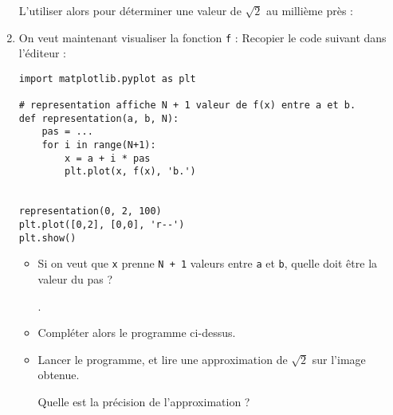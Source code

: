 \documentclass[
	classe=$1^{ere} STI2D$,
]
{informatique}
\begin{document}
\begin{enumerate}
	      L'utiliser alors pour déterminer une valeur de $\sqrt{2}$ au millième près : 
	\item On veut maintenant visualiser la fonction \texttt{f} : Recopier le code suivant dans l'éditeur :
	      \begin{lstlisting}
import matplotlib.pyplot as plt

# representation affiche N + 1 valeur de f(x) entre a et b. 
def representation(a, b, N):
    pas = ...
    for i in range(N+1):
        x = a + i * pas
        plt.plot(x, f(x), 'b.')


representation(0, 2, 100)   
plt.plot([0,2], [0,0], 'r--')
plt.show()
          \end{lstlisting}
	      \begin{itemize}
		      \item Si on veut que \texttt{x} prenne \texttt{N + 1} valeurs entre \texttt{a} et \texttt{b}, quelle doit être la valeur du pas ?

		            .
		      \item Compléter alors le programme ci-dessus.
		      \item Lancer le programme, et lire une approximation de $\sqrt{2}$ sur l'image obtenue.

		            Quelle est la précision de l'approximation ? 
	      \end{itemize}
\end{enumerate}
\end{document}
